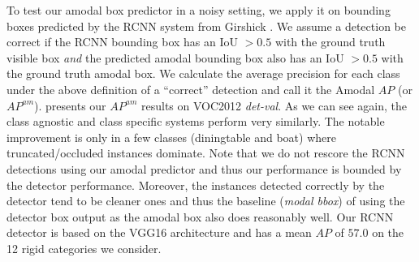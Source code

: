 To test our amodal box predictor in a noisy setting, we apply it on bounding boxes predicted by the RCNN\cite{girshick2013rich} system from Girshick \etal. We assume a detection be correct if the RCNN bounding box has an IoU $> 0.5$ with the ground truth visible box \textit{and} the predicted amodal bounding box also has an IoU $> 0.5$ with the ground truth amodal box. We calculate the average precision for each class under the above definition of a ``correct'' detection and call it the Amodal $AP$ (or $AP^{am}$).  presents our $AP^{am}$ results on VOC2012 \textit{det-val}. As we can see again, the class agnostic and class specific systems perform very similarly. The notable improvement is only in a few classes (\eg diningtable and boat) where truncated/occluded instances dominate. Note that we do not rescore the RCNN detections using our amodal predictor and thus our performance is bounded by the detector performance. Moreover, the instances detected correctly by the detector tend to be cleaner ones and thus the baseline (\textit{modal bbox}) of using the detector box output as the amodal box also does reasonably well. Our RCNN detector is based on the VGG16 \cite{simonyan2014very} architecture and has a mean $AP$ of $57.0$ on the 12 rigid categories we consider.

\renewcommand{\arraystretch}{1.4}
\setlength{\tabcolsep}{6pt}
\begin{table}[htb!]
\centering
{}
\caption{Mean IoU of amodal boxes predicted from the visible bounding box on various subsets of the validation set in PASCAL VOC. Here \textit{occ} and \textit{trunc} refer to occluded and truncated instances respectively. The class specific and class agnostic methods refer to our variations of the training the amodal box regressors (see text for details) and modal bbox refers to the baseline of using the visible/modal bounding box itself as the predicted amodal bounding box.}
\end{table}

